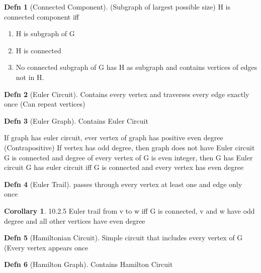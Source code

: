 \documentclass[a4paper]{article}
\theoremstyle{definition}
\newtheorem*{defn}{Defn}
\newtheorem*{corollary}{Corollary}
\newenvironment{theorem}[1]
  {\renewcommand\theinnertheorem{#1}\innertheorem}
  {\endinnertheorem}
\begin{document}
\begin{defn}[Connected Component] (Subgraph of largest possible size)
  H is connected component iff
  \begin{enumerate}
    \item H is subgraph of G
    \item H is connected
    \item No connected subgraph of G has H as subgraph and contains vertices of edges not in H.
  \end{enumerate}
\end{defn}

\begin{defn}[Euler Circuit] Contains every vertex and traverses every edge exactly once (Can repeat vertices) \end{defn}
\begin{defn}[Euler Graph] Contains Euler Circuit \end{defn}

\begin{theorem}{10.2.2} If graph has euler circuit, ever vertex of graph has positive even degree \end{theorem}
\begin{theorem}{10.2.2} (Contrapositive) If vertex has odd degree, then graph does not have Euler circuit \end{theorem}
\begin{theorem}{10.2.3} G is connected and degree of every vertex of G is even integer, then G has Euler circuit \end{theorem}
\begin{theorem}{10.2.4} G has euler circuit iff G is connected and every vertex has even degree \end{theorem}

\begin{defn}[Euler Trail] passes through every vertex at least one and edge only once \end{defn}

\begin{corollary}{10.2.5} Euler trail from v to w iff G is connected, v and w have odd degree and all other vertices have even degree \end{corollary}

\begin{defn}[Hamiltonian Circuit] Simple circuit that includes every vertex of G (Every vertex appears once\end{defn}
\begin{defn}[Hamilton Graph] Contains Hamilton Circuit \end{defn}
\end{document}
